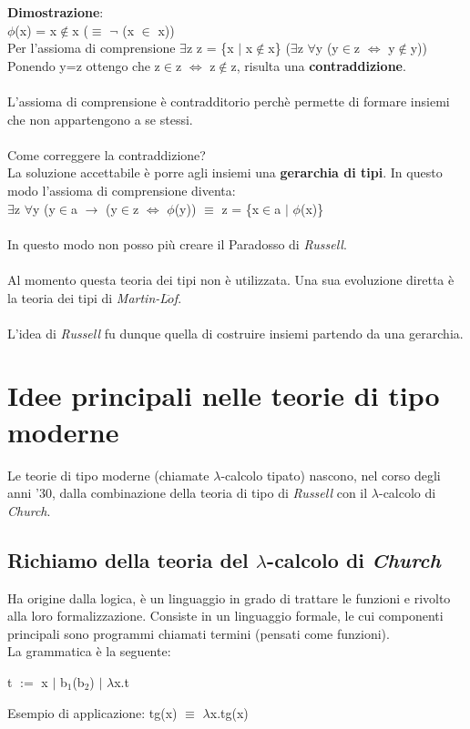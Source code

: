 \documentclass[10pt,a4paper, italian]{book}
\begin{document}
\noindent \textbf{Dimostrazione}:\\
$\phi$(x) = x$\notin$x ($\equiv$ $\neg$ (x $\in$ x))\\
Per l'assioma di comprensione	$\exists$z z = \{x $|$ x$\notin$x\} ($\exists$z $\forall$y (y$\in$z $\Leftrightarrow$ y$\notin$y))\\
Ponendo y=z ottengo che z$\in$z $\Leftrightarrow$ z$\notin$z, risulta una \textbf{contraddizione}.\\\\
L'assioma di comprensione \`e contradditorio perch\`e permette di formare insiemi che non appartengono a se stessi.\\\\
Come correggere la contraddizione?\\
La soluzione accettabile \`e porre agli insiemi una \textbf{gerarchia di tipi}. In questo modo l'assioma di comprensione diventa:\\
$\exists$z $\forall$y (y$\in$a $\to$ (y$\in$z $\Leftrightarrow$ $\phi$(y)) $\equiv$ z = \{x$\in$a $\big|$ $\phi$(x)\}\\\\
In questo modo non posso pi\`u creare il Paradosso di \textit{Russell}.\\\\
Al momento questa teoria dei tipi non \`e utilizzata. Una sua evoluzione diretta \`e 
la teoria dei tipi di \textit{Martin-L$\ddot{o}$f}.\\\\
L'idea di \textit{Russell} fu dunque quella di costruire insiemi partendo da una gerarchia.

\section{Idee principali nelle teorie di tipo moderne}
\label{sec:idee-teorie-moderne}
Le teorie di tipo moderne (chiamate $\lambda$-calcolo tipato) nascono, nel corso degli anni '30, dalla combinazione della teoria di tipo di \textit{Russell} con il $\lambda$-calcolo di \textit{Church}.

\subsection{Richiamo della teoria del $\lambda$-calcolo di \textit{Church}}
\label{subsec:lambda-calcolo}
Ha origine dalla logica, \`e un linguaggio in grado di trattare le funzioni e rivolto alla loro formalizzazione. Consiste in un linguaggio formale, le cui componenti principali sono programmi chiamati termini (pensati come funzioni).\\ La grammatica \`e la seguente:
\begin{center} t $:=$ x $|$ b$_1$(b$_2$) $|$ $\lambda$x.t \end{center}
Esempio di applicazione: tg(x) $\equiv$ $\lambda$x.tg(x)
\end{document}

